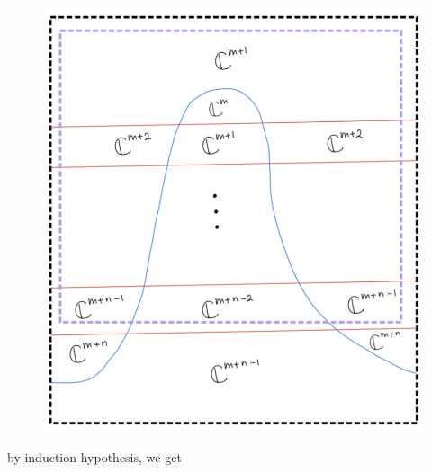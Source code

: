 \begin{enumerate}[label=(\roman*)]
\begin{enumerate}[label=(Step \arabic*)]
\begin{figure}[H]
    \centering
    \includegraphics[scale = 0.95]{diagrams/cobord7/4.png}
    \caption{}
    \label{fig:your-label}
\end{figure}
\pagebreak 
by induction hypothesis, we get


\end{enumerate}
\end{enumerate}
